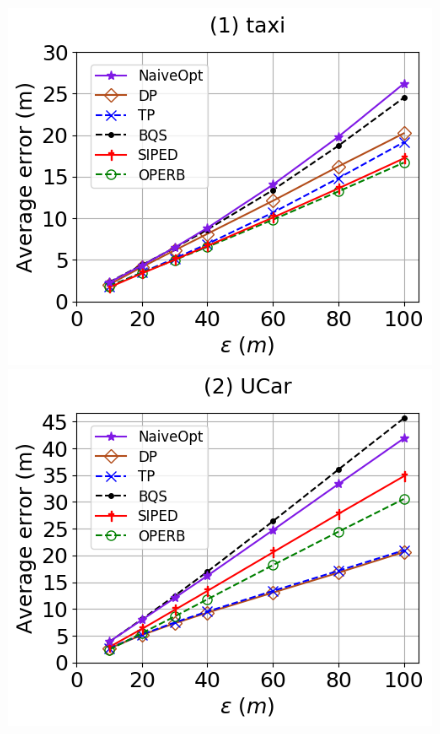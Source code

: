 \begin{figure}[tb!]
	\centering
	\includegraphics[scale=0.315]{Figures/Exp-PED-error-epsilon-taxi.png} \hspace{1ex}
	\includegraphics[scale=0.315]{Figures/Exp-PED-error-epsilon-service.png}	\hspace{1ex}

\end{figure}
